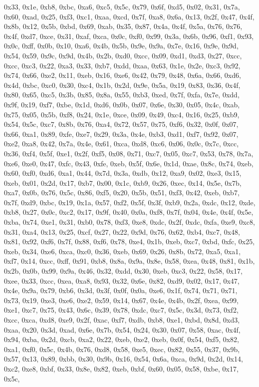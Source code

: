 \documentclass[
]{book}
\begin{document}
0x33, 0x1e, 0xb8, 0xbc, 0xa6, 0xc5, 0x5c, 0x79, 0x6f, 0xd5, 0x02, 0x31, 0x7a, 0x60, 0xad, 0x25, 0xf3, 0xc1, 0xaa, 0xcd, 0x7f, 0xa8, 0x6a, 0x13, 0x2f, 0x47, 0x4f, 0x8b, 0x12, 0x5b, 0xbd, 0x69, 0xab, 0x35, 0x87, 0x4a, 0x4f, 0x5a, 0x76, 0x76, 0x4f, 0xd7, 0xce, 0x31, 0xaf, 0xca, 0x0c, 0xf0, 0x99, 0x3a, 0x6b, 0x96, 0xf1, 0x93, 0x0c, 0xff, 0x0b, 0x10, 0xa6, 0x4b, 0x5b, 0x9e, 0x9a, 0x7e, 0x16, 0x9e, 0x9d, 0x54, 0x59, 0x9c, 0x9d, 0x4b, 0x2b, 0xd0, 0xcc, 0x09, 0xd1, 0xd3, 0x27, 0xcc, 0xcc, 0xc3, 0x22, 0xa3,
0x33, 0xb7, 0xdd, 0xaa, 0x63, 0x1e, 0x2e, 0xc3, 0x92, 0x74, 0x66, 0xe2, 0x11, 0xeb, 0x16, 0xe6, 0x42, 0x79, 0x48, 0x6a, 0x66, 0xd6, 0x4d, 0xbc, 0xc0, 0x30, 0xc4, 0x1b, 0x2d, 0x9e, 0x5a, 0x19, 0x83, 0x36, 0x4f, 0x80, 0x65, 0xc5, 0x3b, 0x85, 0x8a, 0x55, 0xb3, 0xed, 0x7f, 0xfa, 0x7e, 0xdd, 0x9f, 0x19, 0xf7, 0xbe, 0x1d, 0xd6, 0x0b, 0x07, 0x6e, 0x30, 0x05, 0x4c, 0xab, 0x75, 0x05, 0x5b, 0xf8, 0x24, 0x1e, 0xce, 0x09, 0x49, 0xc4, 0x16, 0x25, 0xb9, 0x54, 0x5c, 0xc7, 0x8b, 0x76, 0xa4, 0x72, 0x57, 0x75, 0xf6,
0x32, 0x0f, 0x07, 0x66, 0xa1, 0x89, 0xfe, 0xe7, 0x29, 0x3a, 0x4e, 0xb3, 0xd1, 0xf7, 0x92, 0x07, 0xe2, 0xa8, 0x42, 0x7a, 0x4e, 0x61, 0xca, 0xd8, 0xc6, 0x06, 0x0c, 0x7c, 0xcc, 0x36, 0xf4, 0x5f, 0xe1, 0x2f, 0xf5, 0x08, 0x71, 0xc7, 0x05, 0xc7, 0x53, 0x78, 0x7a, 0xe6, 0xe0, 0x47, 0xfc, 0x43, 0xfe, 0xeb, 0x5f, 0x6e, 0x1d, 0xae, 0x8c, 0x74, 0xeb, 0x60, 0xf0, 0xd6, 0xa1, 0x44, 0x7d, 0x3a, 0xdb, 0x12, 0xa9, 0x02, 0xe3, 0x15, 0xeb, 0x01, 0x2d, 0x17, 0xb7, 0x00, 0x1c, 0xb9, 0x26, 0xec, 0x14, 0x5e, 0x7b, 0xa7,
0x0b, 0x76, 0x5c, 0x86, 0xf5, 0x20, 0x5b, 0x51, 0xf3, 0x42, 0xeb, 0xb7, 0x7f, 0xd9, 0xbc, 0x19, 0x1a, 0x57, 0xf2, 0x5f, 0x3f, 0xb9, 0x2a, 0xdc, 0x12, 0xde, 0xb8, 0x27, 0x0c, 0xc2, 0x17, 0x9f, 0x40, 0x0a, 0xf8, 0x7f, 0x04, 0x4e, 0x4f, 0x5e, 0xba, 0x74, 0xe1, 0x31, 0xb0, 0x78, 0xf3, 0xe8, 0xdc, 0x2f, 0xdc, 0xfa, 0xe9, 0xc8, 0x31, 0xa4, 0x13, 0x25, 0xcf, 0x27, 0x22, 0x9d, 0x76, 0x62, 0xb4, 0xc7, 0x48, 0x81, 0x92, 0xf6, 0x7f, 0x88, 0xf6, 0x78, 0xe4, 0x1b, 0xeb, 0xc7, 0xbd, 0xfc, 0x25, 0xeb, 0x34, 0xe6,
0xca, 0xc0, 0x36, 0xeb, 0x69, 0x26, 0x8b, 0x72, 0xa5, 0xa1, 0xf7, 0x14, 0xcc, 0xff, 0x91, 0xb8, 0x8a, 0x9a, 0x8e, 0x58, 0xea, 0x48, 0x81, 0x1b, 0x2b, 0x0b, 0x99, 0x9a, 0x46, 0x32, 0xdd, 0x30, 0xeb, 0xc3, 0x22, 0x58, 0x17, 0xee, 0x33, 0xcc, 0xea, 0xa8, 0x93, 0x32, 0x6e, 0x82, 0xd9, 0x02, 0x17, 0x47, 0x4e, 0x9a, 0x79, 0xb6, 0x3d, 0x3f, 0x0f, 0x0a, 0xe6, 0x1f, 0x74, 0x71, 0x71, 0x73, 0x19, 0xe3, 0xe6, 0xe2, 0x59, 0x14, 0x67, 0x4e, 0x4b, 0x2f, 0xea, 0x99, 0xe1, 0xc7, 0x75, 0x43, 0x6c, 0x39, 0x78, 0xdc,
0xc7, 0x5c, 0x3d, 0x73, 0xf2, 0xcc, 0xca, 0xd8, 0xe9, 0x2f, 0xac, 0xf7, 0xdb, 0xb8, 0xe1, 0xbd, 0x8d, 0xd3, 0xaa, 0x20, 0x3d, 0xad, 0x6e, 0x7b, 0x54, 0x24, 0x30, 0x07, 0x58, 0xac, 0x4f, 0x94, 0xba, 0x2d, 0xcb, 0xa2, 0x22, 0xeb, 0xe2, 0xeb, 0x0f, 0x54, 0xf5, 0x82, 0xa1, 0xf0, 0x5c, 0x4b, 0x76, 0xd8, 0x58, 0xe5, 0xec, 0x82, 0x55, 0x37, 0x9b, 0x57, 0x13, 0x89, 0xbb, 0x30, 0x9b, 0x16, 0x54, 0x6a, 0xca, 0x9d, 0x2d, 0x14, 0xc2, 0xe8, 0xbf, 0x33, 0x8e, 0x82, 0xeb, 0xbf, 0x60, 0x05, 0x58, 0xbe, 0x17, 0x5c,
\end{document}
